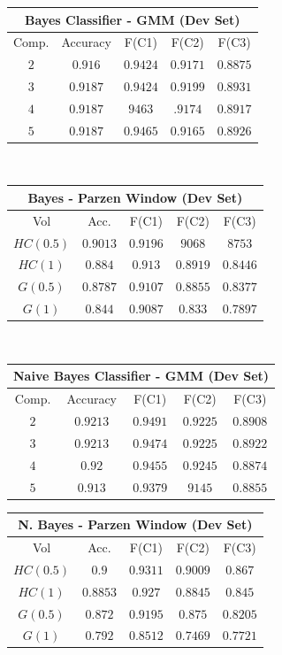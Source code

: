 \documentclass[12pt,journal,compsoc]{IEEEtran}
\begin{document}
\begin{center}
\begin{tabular}{|c|c|c|c|c|}
\multicolumn{5}{c}{Bayes Classifier - GMM (Dev Set)}\\
\hline
Comp. & Accuracy & F(C1) & F(C2) & F(C3)\\
\hline
$2$ &$0.916$ &$0.9424$ &$0.9171$ &$0.8875$\\
\hline
$3$ &$0.9187$ &$0.9424$ &$0.9199$ &$0.8931$\\
\hline
$4$ &$0.9187$ &$9463$ &$.9174$ &$0.8917$\\
\hline
$5$ &$0.9187$ &$0.9465$ &$0.9165$ &$0.8926$\\
\hline
\end{tabular}
\\
\vspace*{0.2cm}

\begin{tabular}{|c|c|c|c|c|}
\multicolumn{5}{c}{Bayes - Parzen Window (Dev Set)}\\
\hline
Vol & Acc. & F(C1) & F(C2) & F(C3)\\
\hline
$HC(0.5)$ &$0.9013$ &$0.9196$ &$9068$ &$8753$\\
\hline
$HC(1)$ &$0.884$ &$0.913$ &$0.8919$ &$0.8446$\\
\hline
$G(0.5)$ &$0.8787$ &$0.9107$ &$0.8855$ &$0.8377$\\
\hline
$G(1)$ &$0.844$ &$0.9087$ &$0.833$ &$0.7897$\\
\hline
\end{tabular}
\\
\vspace*{0.2 cm}

\begin{tabular}{|c|c|c|c|c|}
\multicolumn{5}{c}{Naive Bayes Classifier - GMM (Dev Set)}\\
\hline
Comp. & Accuracy & F(C1) & F(C2) & F(C3)\\
\hline
$2$ &$0.9213$ &$0.9491$ &$0.9225$ &$0.8908$\\
\hline
$3$ &$0.9213$ &$0.9474$ &$0.9225$ &$0.8922$\\
\hline
$4$ &$0.92$ &$0.9455$ &$0.9245$ &$0.8874$\\
\hline
$5$ &$0.913$ &$0.9379$ &$9145$ &$0.8855$\\
\hline
\end{tabular}

\vspace*{0.2 cm}

\begin{tabular}{|c|c|c|c|c|}
\multicolumn{5}{c}{N. Bayes - Parzen Window (Dev Set)}\\
\hline
Vol & Acc. & F(C1) & F(C2) & F(C3)\\
\hline
$HC(0.5)$ &$0.9$ &$0.9311$ &$0.9009$ &$0.867$\\
\hline
$HC(1)$ &$0.8853$ &$0.927$ &$0.8845$ &$0.845$\\
\hline
$G(0.5)$ &$0.872$ &$0.9195$ &$0.875$ &$0.8205$\\
\hline
$G(1)$ &$0.792$ &$0.8512$ &$0.7469$ &$0.7721$\\
\hline
\end{tabular}


\end{center}
\end{document}

